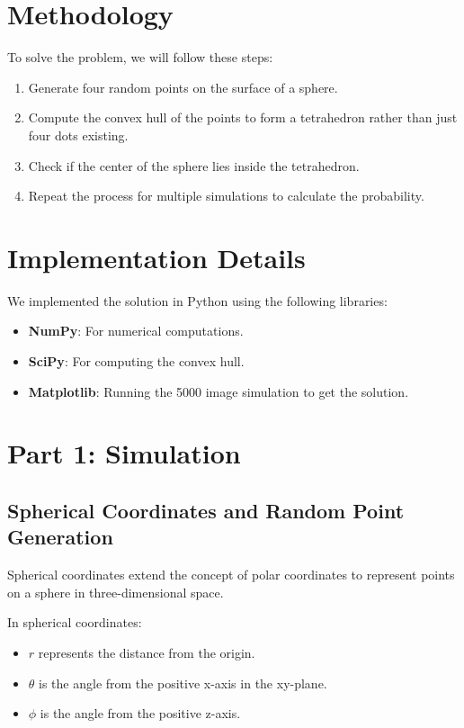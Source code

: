 \documentclass{article}
\begin{document}
\section{Methodology}
To solve the problem, we will follow these steps:

\begin{enumerate}
    \item Generate four random points on the surface of a sphere.
    \item Compute the convex hull of the points to form a tetrahedron rather than just four dots existing.
    \item Check if the center of the sphere lies inside the tetrahedron.
    \item Repeat the process for multiple simulations to calculate the probability.
\end{enumerate}

\section{Implementation Details}
We implemented the solution in Python using the following libraries:

\begin{itemize}
    \item \textbf{NumPy}: For numerical computations.
    \item \textbf{SciPy}: For computing the convex hull.
    \item \textbf{Matplotlib}: Running the 5000 image simulation to get the solution.
\end{itemize}

\section{Part 1: Simulation}

\subsection{Spherical Coordinates and Random Point Generation}

Spherical coordinates extend the concept of polar coordinates to represent points on a sphere in three-dimensional space.

In spherical coordinates:
\begin{itemize}
    \item \( r \) represents the distance from the origin.
    \item \( \theta \) is the angle from the positive x-axis in the xy-plane.
    \item \( \phi \) is the angle from the positive z-axis.
\end{itemize}
\end{document}
